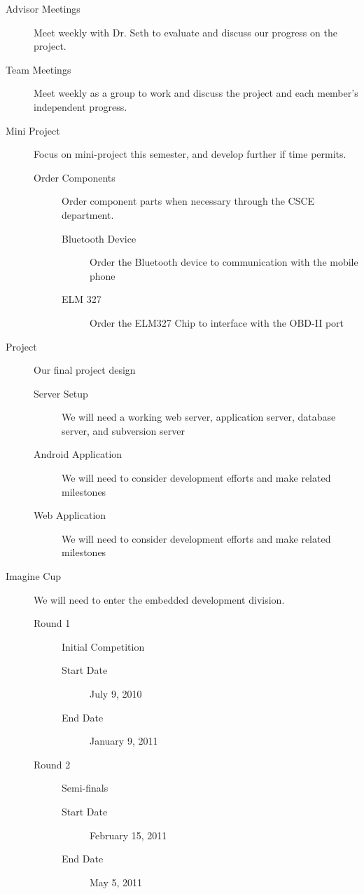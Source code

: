 \documentclass[12pt]{article}
\begin{document}
\begin{description}
	\item[Advisor Meetings] Meet weekly with Dr. Seth to evaluate and discuss our progress on the project.
	\item[Team Meetings] Meet weekly as a group to work and discuss the project and each member's independent progress.
	\item[Mini Project] Focus on mini-project this semester, and develop further if time permits.
	\begin{description}
	
		\item[Order Components] Order component parts when necessary through the CSCE department.
		\begin{description}
			\item[Bluetooth Device] Order the Bluetooth device to communication with the mobile phone
			\item[ELM 327] Order the ELM327 Chip to interface with the OBD-II port
		\end{description}
	\end{description}
	
	\item[Project] Our final project design
		\begin{description}
			\item[Server Setup] We will need a working web server, application server, database server, and subversion server
			\item[Android Application] We will need to consider development efforts and make related milestones
			\item[Web Application] We will need to consider development efforts and make related milestones
		\end{description}
		
	\item[Imagine Cup] We will need to enter the embedded development division.
	\begin{description}
	
		\item[Round 1] Initial Competition
		\begin{description}
			\item[Start Date] July 9, 2010
			\item[End Date] January 9, 2011
		\end{description}
		
		\item[Round 2] Semi-finals
		\begin{description}
			\item[Start Date] February 15, 2011
			\item[End Date] May 5, 2011
		\end{description}
		

\end{description}
\end{description}
\end{document}
